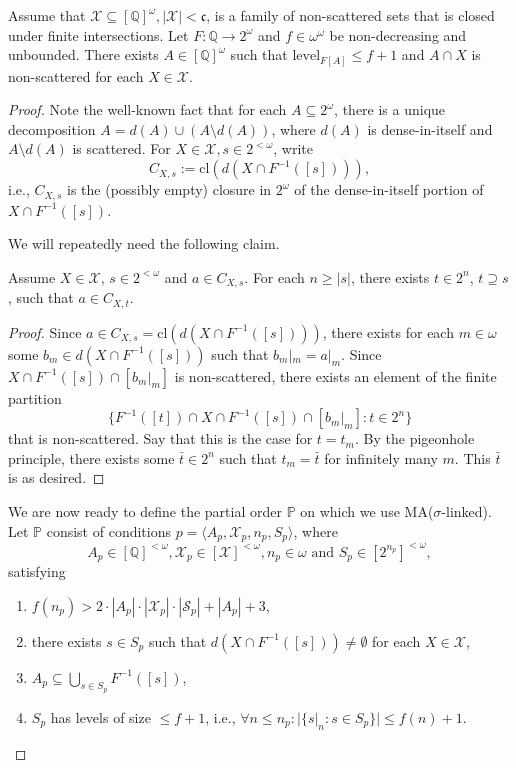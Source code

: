 \documentclass[10pt,a4paper]{amsart}
\newcommand\cls{\text{cl}}
\newcommand\level{\text{level}}
\begin{document}
\begin{lem}\label{lem:starnonscattered}
	Assume that $\mathcal{X}\subseteq [\mathbb{Q}]^{\omega}, |\mathcal{X}|<\mathfrak{c}$, is a family of non-scattered sets that is closed under finite intersections. Let $F: \mathbb{Q}\to 2^\omega$ and $f \in \omega^{\omega}$ be non-decreasing and unbounded. There exists $A \in [\mathbb{Q}]^\omega$ such that $\level_{F[A]}\leq f+1$ and $A \cap X$
 is non-scattered for each $X \in \mathcal{X}$.
 \end{lem}

 \begin{proof}
 Note the well-known fact that for each $A \subseteq 2^\omega$, there is a unique decomposition $A=d(A) \cup (A \setminus d(A))$, where $d(A)$ is dense-in-itself and $A \setminus d(A)$ is scattered. For $X \in \mathcal{X}, s \in 2^{<\omega}$, write
 \[C_{X,s}:=\cls\left(d(X \cap F^{-1}([s]))\right),\]
 i.e., $C_{X,s}$ is the (possibly empty) closure in $2^\omega$ of the dense-in-itself portion of $X \cap F^{-1}([s])$.
 
 We will repeatedly need the following claim.
 
 \begin{claim}\label{claim:extension}
	Assume $X \in \mathcal{X}$, $s \in 2^{<\omega}$ and $a \in C_{X,s}$. For each $n \geq |s|$, there exists $t \in 2^n$, $t \supseteq s$, such that $a \in C_{X,t}$.  
\end{claim}

\begin{proof}
Since $a \in C_{X,s}=\cls\left(d(X \cap F^{-1}([s]))\right) $, there exists for each $m \in \omega$ some $b_m \in d(X \cap F^{-1}([s]))$ such that $b_m|_m = a|_m$. Since $X \cap F^{-1}([s]) \cap [b_m|_m]$ is non-scattered, there exists an element of the finite partition
\[\{F^{-1}([t])\cap X \cap F^{-1}([s]) \cap [b_m|_m]: t \in 2^{n}\}\]
that is non-scattered. Say that this is the case for $t=t_m$. By the pigeonhole principle, there exists some $\bar t \in 2^n$ such that $t_m=\bar t$ for infinitely many $m$. This $\bar t$ is as desired.
\end{proof}
 
 We are now ready to define the partial order $\mathbb{P}$ on which we use \textsf{MA}($\sigma$-linked). Let $\mathbb{P}$ consist of conditions $p=\langle A_p, \mathcal{X}_p, n_p, S_p\rangle$, where
 \[A_p \in [\mathbb{Q}]^{<\omega}, \mathcal{X}_p \in [\mathcal{X}]^{<\omega}, n_p \in \omega \text{ and } S_p \in [2^{n_p}]^{<\omega},\]
 satisfying
 \begin{enumerate}[label=(\roman*)]
 \item $f(n_p)> 2 \cdot |A_p| \cdot |\mathcal{X}_p|\cdot |\mathcal{S}_p|+ |A_p|+3$,
 \item there exists $s \in S_p$ such that $d(X \cap F^{-1}([s]))\neq \emptyset$ for each $X \in \mathcal{X}$,
 \item $A_p \subseteq \bigcup_{s \in S_p}F^{-1}([s])$,
 \item $S_p$ has levels of size $\leq f+1$, i.e., $\forall n \leq n_p: |\{s|_n: s \in S_p\}| \leq f(n)+1$.
 \end{enumerate}


\end{proof}
\end{document}
